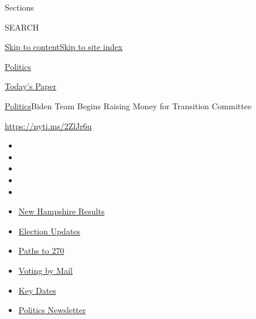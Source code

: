 Sections

SEARCH

\protect\hyperlink{site-content}{Skip to
content}\protect\hyperlink{site-index}{Skip to site index}

\href{https://www.nytimes3xbfgragh.onion/section/politics}{Politics}

\href{https://myaccount.nytimes3xbfgragh.onion/auth/login?response_type=cookie\&client_id=vi}{}

\href{https://www.nytimes3xbfgragh.onion/section/todayspaper}{Today's
Paper}

\href{/section/politics}{Politics}\textbar{}Biden Team Begins Raising
Money for Transition Committee

\url{https://nyti.ms/2ZlJr6u}

\begin{itemize}
\item
\item
\item
\item
\item
\end{itemize}

\begin{itemize}
\item
  \href{https://www.nytimes3xbfgragh.onion/interactive/2020/09/08/us/elections/results-new-hampshire-primary-elections.html?action=click\&pgtype=Article\&state=default\&region=TOP_BANNER\&context=storylines_menu}{New
  Hampshire Results}
\item
  \href{https://www.nytimes3xbfgragh.onion/live/2020/09/09/us/trump-vs-biden?action=click\&pgtype=Article\&state=default\&region=TOP_BANNER\&context=storylines_menu}{Election
  Updates}
\item
  \href{https://www.nytimes3xbfgragh.onion/interactive/2020/us/elections/election-states-biden-trump.html?action=click\&pgtype=Article\&state=default\&region=TOP_BANNER\&context=storylines_menu}{Paths
  to 270}
\item
  \href{https://www.nytimes3xbfgragh.onion/interactive/2020/08/31/us/politics/vote-by-mail-deadlines.html?action=click\&pgtype=Article\&state=default\&region=TOP_BANNER\&context=storylines_menu}{Voting
  by Mail}
\item
  \href{https://www.nytimes3xbfgragh.onion/interactive/2019/us/elections/2020-presidential-election-calendar.html?action=click\&pgtype=Article\&state=default\&region=TOP_BANNER\&context=storylines_menu}{Key
  Dates}
\item
  \href{https://www.nytimes3xbfgragh.onion/newsletters/politics?action=click\&pgtype=Article\&state=default\&region=TOP_BANNER\&context=storylines_menu}{Politics
  Newsletter}
\end{itemize}

